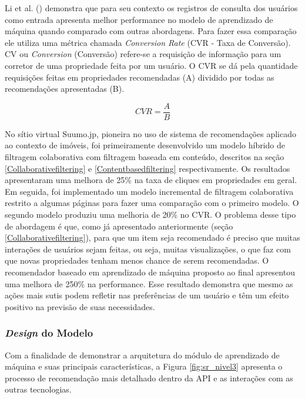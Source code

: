 Li et al. (\citeyear{Summo:2017}) demonstra que para seu contexto os registros de consulta dos usuários como entrada apresenta melhor performance no modelo de aprendizado de máquina quando comparado com outras abordagens. Para fazer essa comparação ele utiliza uma métrica chamada \textit{Conversion Rate} (CVR - Taxa de Conversão). CV ou \textit{Conversion} (Conversão) refere-se a requisição de informação para um corretor de uma propriedade feita por um usuário. O CVR se dá pela quantidade requisições feitas em propriedades recomendadas (A) dividido por todas as recomendações apresentadas (B).

\begin{equation}
    CVR=\frac{A}{B}
\end{equation}

No sítio virtual Suumo.jp, pioneira no uso de sistema de recomendações aplicado ao contexto de imóveis, foi primeiramente desenvolvido um modelo híbrido de filtragem colaborativa com filtragem baseada em conteúdo, descritos na seção \ref{Collaborativefiltering} e \ref{Contentbasedfiltering} respectivamente. Os resultados apresentaram uma melhora de 25\% na taxa de cliques em propriedades em geral. Em seguida, foi implementado um modelo incremental de filtragem colaborativa restrito a algumas páginas para fazer uma comparação com o primeiro modelo. O segundo modelo produziu uma melhoria de 20\% no CVR. O problema desse tipo de abordagem é que, como já apresentado anteriormente (seção \ref{Collaborativefiltering}), para que um item seja recomendado é preciso que muitas interações de usuários sejam feitas, ou seja, muitas visualizações, o que faz com que novas propriedades tenham menos chance de serem recomendadas. O recomendador baseado em aprendizado de máquina proposto ao final apresentou uma melhora de 250\% na performance. Esse resultado demonstra que mesmo as ações mais sutis podem refletir nas preferências de um usuário e têm um efeito positivo na previsão de suas necessidades.

\subsubsection{\textit{Design} do Modelo}
\label{design_modelo}

Com a finalidade de demonstrar a arquitetura do módulo de aprendizado de máquina e suas principais características, a Figura \ref{fig:sr_nivel3} apresenta o processo de recomendação mais detalhado dentro da API e as interações com as outras tecnologias.

